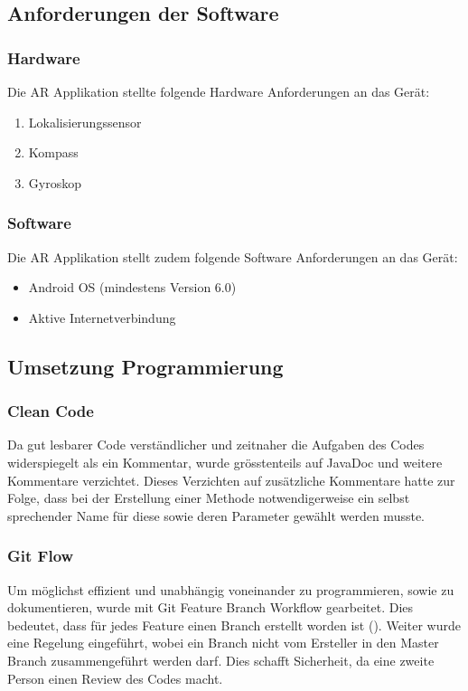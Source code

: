 \documentclass[a4paper]{scrreprt}
\begin{document}
\subsection{Anforderungen der Software}
\subsubsection{Hardware}
Die AR Applikation stellte folgende Hardware Anforderungen an das Gerät:
\begin{enumerate}
	\item Lokalisierungssensor
	\item Kompass
	\item Gyroskop
\end{enumerate}
\subsubsection{Software}
Die AR Applikation stellt zudem folgende Software Anforderungen an das Gerät:
\begin{itemize}
	\item Android OS (mindestens Version 6.0)
	\item Aktive Internetverbindung
\end{itemize}
\subsection{Umsetzung Programmierung}
\subsubsection{Clean Code}
Da gut lesbarer Code verständlicher und zeitnaher die Aufgaben des Codes widerspiegelt als ein Kommentar, wurde grösstenteils auf JavaDoc und weitere Kommentare verzichtet. Dieses Verzichten auf zusätzliche Kommentare hatte zur Folge, dass bei der Erstellung einer Methode notwendigerweise ein selbst sprechender Name für diese sowie deren Parameter gewählt werden musste. 
\subsubsection{Git Flow}
Um möglichst effizient und unabhängig voneinander zu programmieren, sowie zu dokumentieren, wurde mit Git Feature Branch Workflow gearbeitet. Dies bedeutet, dass für jedes Feature einen Branch erstellt worden ist (\cite{gitFeatureBranchWorkflow}). Weiter wurde eine Regelung eingeführt, wobei ein Branch nicht vom Ersteller in den Master Branch zusammengeführt werden darf. Dies schafft Sicherheit, da eine zweite Person einen Review des Codes macht.
\end{document}

